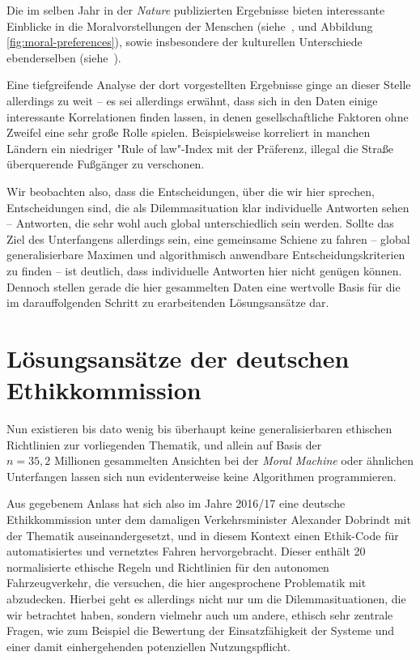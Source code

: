 \documentclass[twocolumn, german]{tum-article}
\begin{document}
Die im selben Jahr in der \emph{Nature} publizierten Ergebnisse bieten interessante Einblicke in die Moralvorstellungen der Menschen (siehe~\cite[S. 61]{moral-machine}, und Abbildung \vref{fig:moral-preferences}), sowie insbesondere der kulturellen Unterschiede ebenderselben (siehe~\cite[S. 62]{moral-machine}).

Eine tiefgreifende Analyse der dort vorgestellten Ergebnisse ginge an dieser Stelle allerdings zu weit -- es sei allerdings erwähnt, dass sich in den Daten einige interessante Korrelationen finden lassen, in denen gesellschaftliche Faktoren ohne Zweifel eine sehr große Rolle spielen.
Beispielsweise korreliert in manchen Ländern ein niedriger "Rule of law"-Index mit der Präferenz, illegal die Straße überquerende Fußgänger zu verschonen.

Wir beobachten also, dass die Entscheidungen, über die wir hier sprechen, Entscheidungen sind, die als Dilemmasituation klar individuelle Antworten sehen -- Antworten, die sehr wohl auch global unterschiedlich sein werden.
Sollte das Ziel des Unterfangens allerdings sein, eine gemeinsame Schiene zu fahren -- global generalisierbare Maximen und algorithmisch anwendbare Entscheidungskriterien zu finden -- ist deutlich, dass individuelle Antworten hier nicht genügen können. Dennoch stellen gerade die hier gesammelten Daten eine wertvolle Basis für die im darauffolgenden Schritt zu erarbeitenden Lösungsansätze dar.


\section{Lösungsansätze der deutschen Ethikkommission}
Nun existieren bis dato wenig bis überhaupt keine generalisierbaren ethischen Richtlinien zur vorliegenden Thematik, und allein auf Basis der $n = 35,2\,\,\text{Millionen}$ gesammelten Ansichten bei der \emph{Moral Machine} oder ähnlichen Unterfangen lassen sich nun evidenterweise keine Algorithmen programmieren.

Aus gegebenem Anlass hat sich also im Jahre 2016/17 eine deutsche Ethikkommission unter dem damaligen Verkehrsminister Alexander Dobrindt mit der Thematik auseinandergesetzt, und in diesem Kontext einen Ethik-Code für automatisiertes und vernetztes Fahren hervorgebracht.
Dieser enthält 20 normalisierte ethische Regeln und Richtlinien für den autonomen Fahrzeugverkehr, die versuchen, die hier angesprochene Problematik mit abzudecken.
Hierbei geht es allerdings nicht nur um die Dilemmasituationen, die wir betrachtet haben, sondern vielmehr auch um andere, ethisch sehr zentrale Fragen, wie zum Beispiel die Bewertung der Einsatzfähigkeit der Systeme und einer damit einhergehenden potenziellen Nutzungspflicht.
\end{document}
